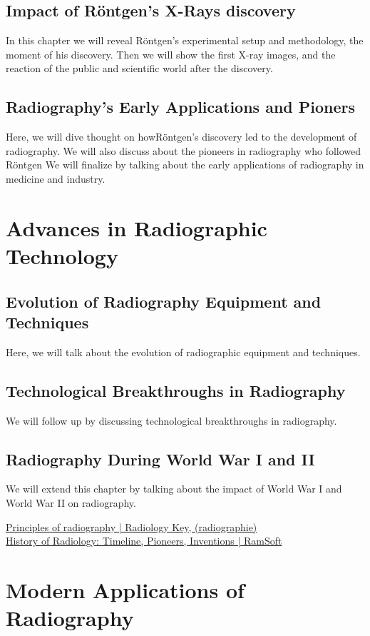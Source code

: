 \documentclass[a4paper,12pt]{report}
\begin{document}
\section{Impact of Röntgen's X-Rays discovery}
In this chapter we will reveal Röntgen's experimental setup and methodology, the moment of his discovery. Then we will show the first X-ray images, and the reaction of the public and scientific world after the discovery.
\section{Radiography's Early Applications and Pioners}
Here, we will dive thought on howRöntgen's discovery led to the development of radiography. We will also discuss about the pioneers in radiography who followed Röntgen We will finalize by talking about the early applications of radiography in medicine and industry.

\chapter{Advances in Radiographic Technology}
\section{Evolution of Radiography Equipment and Techniques}
Here, we will talk about the evolution of radiographic equipment and techniques. 
\section{	Technological Breakthroughs in Radiography}
We will follow up by discussing technological breakthroughs in radiography. 
\section{Radiography During World War I and II}
We will extend this chapter by talking about the impact of World War I and World War II on radiography. 

\href{https://radiologykey.com/principles-of-radiography/}{Principles of radiography | Radiology Key, (radiographie) }\\
\href{https://www.ramsoft.com/history-of-radiology/}{History of Radiology: Timeline, Pioneers, Inventions | RamSoft  }

\chapter{Modern Applications of Radiography}
\end{document}
